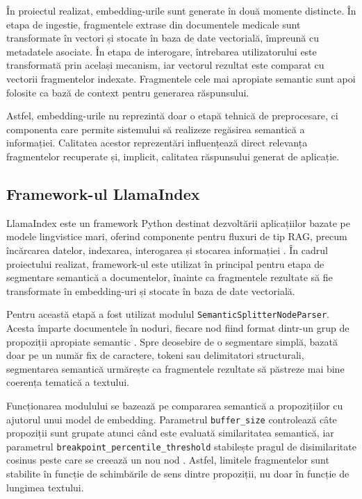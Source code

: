 \documentclass[12pt, a4paper, oneside, romanian]{teza-upb}
\begin{document}
În proiectul realizat, embedding-urile sunt generate în două momente distincte. În etapa de ingestie, fragmentele extrase din documentele medicale sunt transformate în vectori și stocate în baza de date vectorială, împreună cu metadatele asociate. În etapa de interogare, întrebarea utilizatorului este transformată prin același mecanism, iar vectorul rezultat este comparat cu vectorii fragmentelor indexate. Fragmentele cele mai apropiate semantic sunt apoi folosite ca bază de context pentru generarea răspunsului.

Astfel, embedding-urile nu reprezintă doar o etapă tehnică de preprocesare, ci componenta care permite sistemului să realizeze regăsirea semantică a informației. Calitatea acestor reprezentări influențează direct relevanța fragmentelor recuperate și, implicit, calitatea răspunsului generat de aplicație.

\subsection{Framework-ul LlamaIndex}

LlamaIndex este un framework Python destinat dezvoltării aplicațiilor bazate pe modele lingvistice mari, oferind componente pentru fluxuri de tip RAG, precum încărcarea datelor, indexarea, interogarea și stocarea informației \cite{llamaindex_doc}. În cadrul proiectului realizat, framework-ul este utilizat în principal pentru etapa de segmentare semantică a documentelor, înainte ca fragmentele rezultate să fie transformate în embedding-uri și stocate în baza de date vectorială.

Pentru această etapă a fost utilizat modulul \texttt{SemanticSplitterNodeParser}. Acesta împarte documentele în noduri, fiecare nod fiind format dintr-un grup de propoziții apropiate semantic \cite{llamaindex_semantic_splitter}. Spre deosebire de o segmentare simplă, bazată doar pe un număr fix de caractere, tokeni sau delimitatori structurali, segmentarea semantică urmărește ca fragmentele rezultate să păstreze mai bine coerența tematică a textului.

Funcționarea modulului se bazează pe compararea semantică a propozițiilor cu ajutorul unui model de embedding. Parametrul \texttt{buffer\_size} controlează câte propoziții sunt grupate atunci când este evaluată similaritatea semantică, iar parametrul \texttt{breakpoint\_percentile\_threshold} stabilește pragul de disimilaritate cosinus peste care se creează un nou nod \cite{llamaindex_semantic_splitter}. Astfel, limitele fragmentelor sunt stabilite în funcție de schimbările de sens dintre propoziții, nu doar în funcție de lungimea textului.
\end{document}
